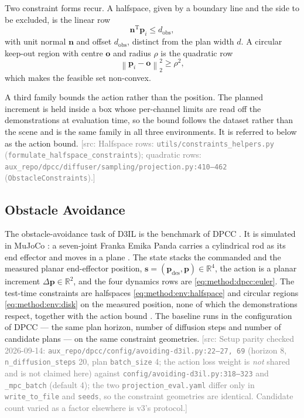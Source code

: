 \documentclass[headsepline,footsepline,footinclude=false,oneside,fontsize=11pt,paper=a4,listof=totoc,bibliography=totoc]{scrbook}
\theoremstyle{definition}
\theoremstyle{plain}
\theoremstyle{remark}
\newcommand{\vect}[1]{\boldsymbol{#1}}
\newcommand{\trans}{^{\textrm{T}}}
\newcommand{\sidx}[1]{_{\textrm{#1}}}
\newcommand{\R}{\mathbb{R}}                    %
\newif\ifsubmission
\newcommand{\srcnote}[1]{\ifsubmission\else\textcolor{gray}{\footnotesize\textsf{[src: #1]}}\fi}
\begin{document}
Two constraint forms recur. A halfspace, given by a boundary line and the side to be excluded, is the
linear row
\begin{equation}\label{eq:method:env:halfspace}
  \vect{n}\trans\vect{p}_{i} \le d\sidx{obs} ,
\end{equation}
with unit normal $\vect{n}$ and offset $d\sidx{obs}$, distinct from the plan width $d$. A circular keep-out region with centre $\vect{o}$ and radius
$\rho$ is the quadratic row
\begin{equation}\label{eq:method:env:disk}
  \left\|\vect{p}_{i}-\vect{o}\right\|_{2}^{2} \ge \rho^{2},
\end{equation}
which makes the feasible set non-convex.

A third family bounds the action rather than the position. The planned increment is held inside a
box whose per-channel limits are read off the demonstrations at evaluation time, so the bound
follows the dataset rather than the scene and is the same family in all three environments. It is
referred to below as the action bound.
\srcnote{Halfspace rows: \texttt{utils/constraints\_helpers.py} (\texttt{formulate\_halfspace\_constraints});
quadratic rows: \texttt{aux\_repo/dpcc/diffuser/sampling/projection.py:410--462}
(\texttt{ObstacleConstraints}).}

\subsection{Obstacle Avoidance}\label{sec:method:env:avoiding}

The obstacle-avoidance task of D3IL \parencite{jia2024towards} is the benchmark of \ac{DPCC}
\parencite[Sec.~6.1]{romer2025diffusion}. It is simulated in MuJoCo
\parencite{todorov2012mujoco}: a seven-joint Franka Emika Panda carries a cylindrical rod as its end
effector and moves in a plane \parencite[Sec.~3.3]{jia2024towards}. The state stacks the commanded and the measured planar
end-effector position, $\vect{s} = (\vect{p}\sidx{des},\vect{p})\in\R^{4}$, the action is a planar
increment $\Delta\vect{p}\in\R^{2}$, and the four dynamics rows are \eqref{eq:method:dpcc:euler}. The
test-time constraints are halfspaces \eqref{eq:method:env:halfspace} and circular regions
\eqref{eq:method:env:disk} on the measured position, none of which the demonstrations respect, together
with the action bound \parencite[Sec.~6.1]{romer2025diffusion}. The baseline runs in the configuration of \ac{DPCC} --- the
same plan horizon, number of diffusion steps and number of candidate plans --- on the
same constraint geometries.
\srcnote{Setup parity checked 2026-09-14: \texttt{aux\_repo/dpcc/config/avoiding-d3il.py:22--27, 69}
(horizon 8, \texttt{n\_diffusion\_steps} 20, plan \texttt{batch\_size} 4; the action loss weight is
\emph{not} shared and is not claimed here)
against \texttt{config/avoiding-d3il.py:318--323} and \texttt{\_mpc\_batch} (default 4); the two
\texttt{projection\_eval.yaml} differ only in \texttt{write\_to\_file} and \texttt{seeds}, so the
constraint geometries are identical. Candidate count varied as a factor elsewhere is v3's protocol.}
\end{document}
